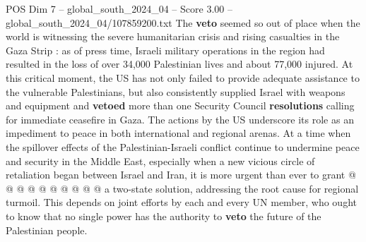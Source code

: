 \begin{textsample}{POS Dim 7 – global\_south\_2024\_04 – Score 3.00 – global\_south\_2024\_04/107859200.txt}
The \textbf{veto} seemed so out of place when the world is witnessing the severe humanitarian crisis and rising casualties in the Gaza Strip : as of press time, Israeli military operations in the region had resulted in the loss of over 34,000 Palestinian lives and about 77,000 injured.
At this critical moment, the US has not only failed to provide adequate assistance to the vulnerable Palestinians, but also consistently supplied Israel with weapons and equipment and \textbf{vetoed} more than one Security Council \textbf{resolutions} calling for immediate ceasefire in Gaza.
The actions by the US underscore its role as an impediment to peace in both international and regional arenas.
At a time when the spillover effects of the Palestinian-Israeli conflict continue to undermine peace and security in the Middle East, especially when a new vicious circle of retaliation began between Israel and Iran, it is more urgent than ever to grant @ @ @ @ @ @ @ @ @ @ a two-state solution, addressing the root cause for regional turmoil.
This depends on joint efforts by each and every UN member, who ought to know that no single power has the authority to \textbf{veto} the future of the Palestinian people.

\end{textsample}
